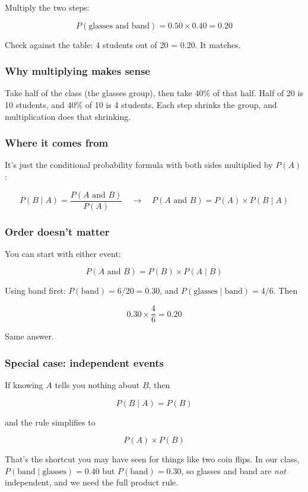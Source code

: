 Multiply the two steps:

\[
P(\text{glasses and band}) = 0.50 \times 0.40 = 0.20
\]

Check against the table: 4 students out of 20 = 0.20. It matches.

\subsubsection*{Why multiplying makes sense}

Take half of the class (the glasses group), then take 40\% of that half. Half of 20 is 10 students, and 40\% of 10 is 4 students. Each step shrinks the group, and multiplication does that shrinking.

\subsubsection*{Where it comes from}

It's just the conditional probability formula with both sides multiplied by $P(A)$:

\[
P(B \mid A) = \frac{P(A \text{ and } B)}{P(A)} \quad \rightarrow \quad P(A \text{ and } B) = P(A) \times P(B \mid A)
\]

\subsubsection*{Order doesn't matter}

You can start with either event:

\[
P(A \text{ and } B) = P(B) \times P(A \mid B)
\]

Using band first: $P(\text{band}) = 6/20 = 0.30$, and $P(\text{glasses} \mid \text{band}) = 4/6$. Then

\[
0.30 \times \frac{4}{6} = 0.20
\]

Same answer.

\subsubsection*{Special case: independent events}

If knowing $A$ tells you nothing about $B$, then

\[
P(B \mid A) = P(B)
\]

and the rule simplifies to

\[
P(A) \times P(B)
\]

That's the shortcut you may have seen for things like two coin flips. In our class, $P(\text{band} \mid \text{glasses}) = 0.40$ but $P(\text{band}) = 0.30$, so glasses and band are \emph{not} independent, and we need the full product rule.

